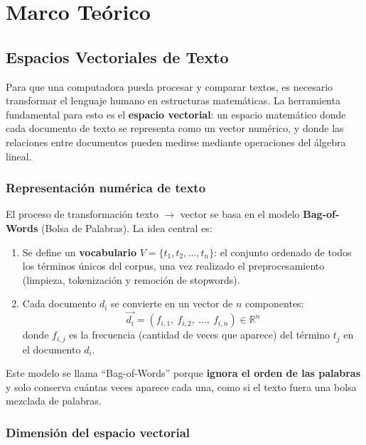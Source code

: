 \section{Marco Teórico}

\subsection{Espacios Vectoriales de Texto}

Para que una computadora pueda procesar y comparar textos, es necesario transformar el lenguaje humano en estructuras matemáticas. La herramienta fundamental para esto es el \textbf{espacio vectorial}: un espacio matemático donde cada documento de texto se representa como un vector numérico, y donde las relaciones entre documentos pueden medirse mediante operaciones del álgebra lineal.

\subsubsection{Representación numérica de texto}

El proceso de transformación texto $\rightarrow$ vector se basa en el modelo \textbf{Bag-of-Words} (Bolsa de Palabras). La idea central es:

\begin{enumerate}
    \item Se define un \textbf{vocabulario} $V = \{t_1, t_2, \ldots, t_n\}$: el conjunto ordenado de todos los términos únicos del corpus, una vez realizado el preprocesamiento (limpieza, tokenización y remoción de stopwords).
    \item Cada documento $d_i$ se convierte en un vector de $n$ componentes:
    \[
    \vec{d_i} = (f_{i,1},\ f_{i,2},\ \ldots,\ f_{i,n}) \in \mathbb{R}^n
    \]
    donde $f_{i,j}$ es la frecuencia (cantidad de veces que aparece) del término $t_j$ en el documento $d_i$.
\end{enumerate}

Este modelo se llama ``Bag-of-Words'' porque \textbf{ignora el orden de las palabras} y solo conserva cuántas veces aparece cada una, como si el texto fuera una bolsa mezclada de palabras.

\subsubsection{Dimensión del espacio vectorial}

